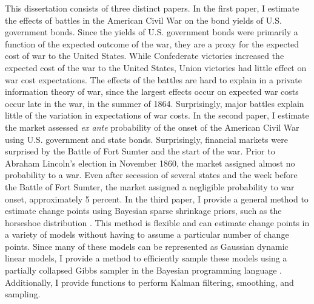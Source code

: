 
This dissertation consists of three distinct papers.
In the first paper, I estimate the effects of battles in the American Civil War on the bond yields of U.S. government bonds.
Since the yields of U.S. government bonds were primarily a function of the expected outcome of the war, they are a proxy for the expected cost of war to the United States.
While Confederate victories increased the expected cost of the war to the United States, Union victories had little effect on war cost expectations.
The effects of the battles are hard to explain in a private information theory of war, since the largest effects occur on expected war costs occur late in the war, in the summer of 1864.
Surprisingly, major battles explain little of the variation in expectations of war costs.
In the second paper, I estimate the market assessed \textit{ex ante} probability of the onset of the American Civil War using U.S. government and state bonds.
Surprisingly, financial markets were surprised by the Battle of Fort Sumter and the start of the war.
Prior to Abraham Lincoln's election in November 1860, the market assigned almost no probability to a war.
Even after secession of several states and the week before the Battle of Fort Sumter, the market assigned a negligible probability to war onset, approximately 5 percent.
In the third paper, I provide a general method to estimate change points using Bayesian sparse shrinkage priors, such as the horseshoe distribution \parencite{CarvalhoPolsonScott2010}.
This method is flexible and can estimate change points in a variety of models without having to assume a particular number of change points.
Since many of these models can be represented as Gaussian dynamic linear models, I provide a method to efficiently sample these models using a partially collapsed Gibbs sampler in the Bayesian programming language \Stan{}.
Additionally, I provide \Stan{} functions to perform Kalman filtering, smoothing, and sampling.




